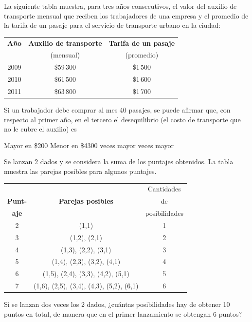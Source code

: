 \documentclass[10pt,letterpaper,addpoints]{exam}
\begin{document}
\begin{multicols}{2}
\begin{questions}
\question La siguiente tabla muestra, para tres años consecutivos, el valor del auxilio de transporte mensual que reciben los trabajadores de una empresa y el promedio de la tarifa de un pasaje para el servicio de transporte urbano en la ciudad:
\begin{center}
\begin{tabular}{|c|c|c|}
\hline 
\textbf{Año} & \textbf{Auxilio de transporte} & \textbf{Tarifa de un pasaje} \\ 
 & (mensual) & (promedio) \\ 
\hline 
2009 & \$59\,300 & \$1\,500 \\ 
\hline 
2010 & \$61\,500 & \$1\,600 \\ 
\hline 
2011 & \$63\,800 & \$1\,700 \\ 
\hline 
\end{tabular} 
\end{center}
Si un trabajador debe comprar al mes 40 pasajes, se puede afirmar que, con respecto al primer año, en el tercero el desequilibrio (el costo de transporte que no le cubre el auxilio) es
\begin{choices}
\begin{multicols}{2}
\choice Mayor en \$200
\choice Menor en \$4300
 veces mayor
 veces mayor
\end{multicols}
\end{choices}
\question Se lanzan 2 dados y se considera la suma de los puntajes obtenidos. La tabla muestra las parejas posibles para algunos puntajes.
\begin{center}
\begin{tabular}{|c|c|c|}
\hline 
 &  & Cantidades\\
\textbf{Punt-} & \textbf{Parejas posibles} & de \\ 
\textbf{aje} &  & posibilidades \\ 
\hline 
2 & (1,1) & 1 \\ 
\hline 
3 & (1,2), (2,1) & 2 \\ 
\hline 
4 & (1,3), (2,2), (3,1) & 3 \\ 
\hline 
5 & (1,4), (2,3), (3,2), (4,1) & 4 \\ 
\hline 
6 & (1,5), (2,4), (3,3), (4,2), (5,1) & 5 \\ 
\hline 
7 & (1,6), (2,5), (3,4), (4,3), (5,2), (6,1) & 6 \\ 
\hline 
\end{tabular} 
\end{center}
Si se lanzan dos veces los 2 dados, ¿cuántas posibilidades hay de obtener 10 puntos en total, de manera que en el primer lanzamiento se obtengan 6 puntos?


\end{questions}
\end{multicols}
\end{document}
